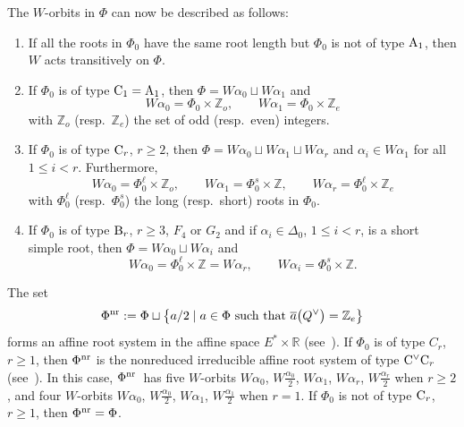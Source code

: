 \documentclass[pdftex]{sigma}
\numberwithin{equation}{section}
\begin{document}
The $W$-orbits in $\Phi$ can now be described as follows:
\begin{enumerate}\itemsep=0pt
\item[$(1)$] If all the roots in $\Phi_0$ have the same root length but $\Phi_0$ is not of type $\textup{A}_1$, then $W$ acts transitively on $\Phi$.
\item[$(2)$] If $\Phi_0$ is of type ${\rm C}_1=\textup{A}_1$, then $\Phi=W\alpha_0\sqcup W\alpha_1$ and
\[
W\alpha_0=\Phi_0\times\mathbb{Z}_o,\qquad W\alpha_1=\Phi_0\times\mathbb{Z}_e
\]
with $\mathbb{Z}_o$ (resp.\ $\mathbb{Z}_e$) the set of odd (resp.\ even) integers.
\item[$(3)$] If $\Phi_0$ is of type ${\rm C}_r$, $r\geq 2$, then $\Phi=W\alpha_0\sqcup W\alpha_1\sqcup W\alpha_r$ and $\alpha_i\in W\alpha_1$ for all $1\leq i<r$. Furthermore,
\[
W\alpha_0=\Phi_0^\ell\times\mathbb{Z}_o,\qquad W\alpha_1=\Phi_0^s\times\mathbb{Z},\qquad W\alpha_r=\Phi_0^\ell\times\mathbb{Z}_e
\]
with $\Phi_0^\ell$ (resp.\ $\Phi_0^s$) the long (resp.\ short) roots in $\Phi_0$.
\item[$(4)$] If $\Phi_0$ is of type $\textup{B}_r$, $r\geq 3$, $F_4$ or $G_2$ and if $\alpha_i\in\Delta_0$, $1\leq i<r$, is a short simple root, then $\Phi=W\alpha_0\sqcup W\alpha_i$ and
\[
W\alpha_0=\Phi_0^\ell\times\mathbb{Z}=W\alpha_r,\qquad W\alpha_i=\Phi_0^s\times\mathbb{Z}.
\]
\end{enumerate}
The set
\[
\Phi^{\textup{nr}}:=\Phi\sqcup\bigl\{a/2\mid a\in\Phi\ \textup{such that}\ \overline{a}\bigl(Q^\vee\bigr)=\mathbb{Z}_e\big\}
\]
forms an affine root system in the affine space $E^*\times\mathbb{R}$ (see~\cite{MacAff}). If $\Phi_0$ is of type $C_r$, $r\geq 1$, then $\Phi^{\textup{nr}}$ is the nonreduced irreducible affine root system of type ${\rm C}^\vee{\rm C}_r$ (see~\cite{MacAff}). In this case, $\Phi^{\textup{nr}}$~has five $W$-orbits $W\alpha_0$, $W\frac{\alpha_0}{2}$, $W\alpha_1$, $W\alpha_r$, $W\frac{\alpha_r}{2}$ when $r\geq 2$, and four $W$-orbits
$W\alpha_0$, $W\frac{\alpha_0}{2}$, $W\alpha_1$, $W\frac{\alpha_1}{2}$ when $r=1$. If $\Phi_0$ is not of type ${\rm C}_r$, $r\geq 1$, then $\Phi^{\textup{nr}}=\Phi$.
\end{document}
